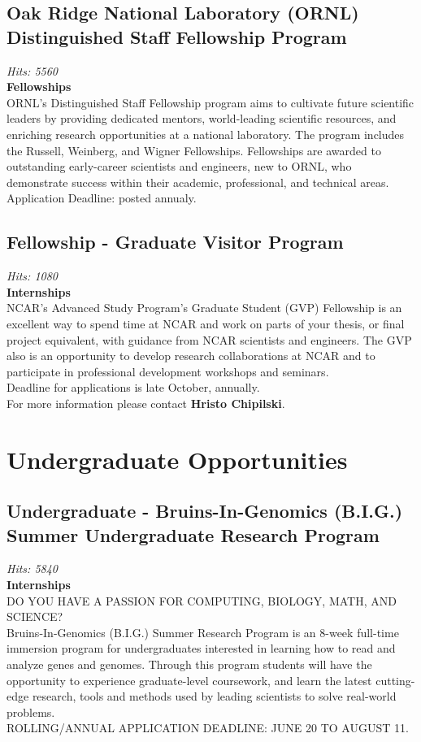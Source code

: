 \documentclass[12pt,a4paper]{article}
\begin{document}
\subsection{Oak Ridge National Laboratory (ORNL) Distinguished Staff Fellowship Program}
\textit{Hits: 5560} \\
\textbf{Fellowships} \\
ORNL’s Distinguished Staff Fellowship program aims to cultivate future scientific leaders by providing dedicated mentors, world-leading scientific resources, and enriching research opportunities at a national laboratory. The program includes the Russell, Weinberg, and Wigner Fellowships. Fellowships are awarded to outstanding early-career scientists and engineers, new to ORNL, who demonstrate success within their academic, professional, and technical areas. \\
Application Deadline: posted annualy.

\subsection{Fellowship - Graduate Visitor Program}
\textit{Hits: 1080} \\
\textbf{Internships} \\
NCAR's Advanced Study Program's Graduate Student (GVP) Fellowship is an excellent way to spend time at NCAR and work on parts of your thesis, or final project equivalent, with guidance from NCAR scientists and engineers. The GVP also is an opportunity to develop research collaborations at NCAR and to participate in professional development workshops and seminars. \\
Deadline for applications is late October, annually. \\
For more information please contact \textbf{Hristo Chipilski}.

\section{Undergraduate Opportunities}

\subsection{Undergraduate - Bruins-In-Genomics (B.I.G.) Summer Undergraduate Research Program}
\textit{Hits: 5840} \\
\textbf{Internships} \\
DO YOU HAVE A PASSION FOR COMPUTING, BIOLOGY, MATH, AND SCIENCE? \\
Bruins-In-Genomics (B.I.G.) Summer Research Program is an 8-week full-time immersion program for undergraduates interested in learning how to read and analyze genes and genomes. Through this program students will have the opportunity to experience graduate-level coursework, and learn the latest cutting-edge research, tools and methods used by leading scientists to solve real-world problems. \\
ROLLING/ANNUAL APPLICATION DEADLINE: JUNE 20 TO AUGUST 11.
\end{document}

